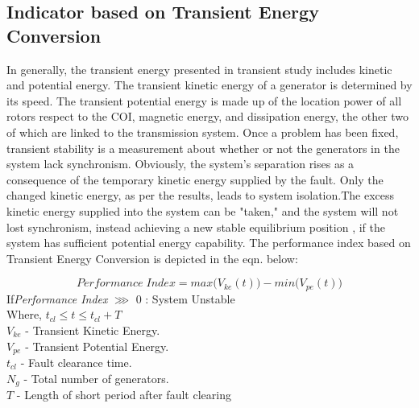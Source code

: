 \subsection{Indicator based on Transient Energy Conversion}
In generally, the transient energy presented in transient study includes kinetic and potential energy. The transient kinetic energy of a generator is determined by its speed. The transient potential energy is made up of the location power of all rotors respect to the COI, magnetic energy, and dissipation energy, the other two of which are linked to the transmission system. Once a problem has been fixed, transient stability is a measurement about whether or not the generators in the system lack synchronism. Obviously, the system's separation rises as a consequence of the temporary kinetic energy supplied by the fault. Only the changed kinetic energy, as per the results, leads to system isolation.The excess kinetic energy supplied into the system can be "taken," and the system will not lost synchronism, instead achieving a new stable equilibrium position \cite{EPM}, if the system has sufficient potential energy capability. The performance index based on Transient Energy Conversion is depicted in the eqn. below:

\begin{equation}
Performance \; Index = max\big(V_{ke}(t)\big) - min\big(V_{pe}(t)\big)
\end{equation}
\tab If\tab  \textit{Performance Index } \(\ggg\) 0 : System Unstable\\
\tab Where, \hspace{0.7 cm}\(t_{cl} \leq t \leq t_{cl}+T\) 
\\\tab\tab\tab \(V_{ke}\) - Transient Kinetic Energy.
\\\tab\tab\tab \(V_{pe}\) - Transient Potential Energy.
\\\tab\tab\tab \(t_{cl}\) - Fault clearance time. 
\\\tab\tab\tab \(N_g\) -  Total number of generators.
\\\tab\tab\tab \(T\) - Length of short period after fault clearing

